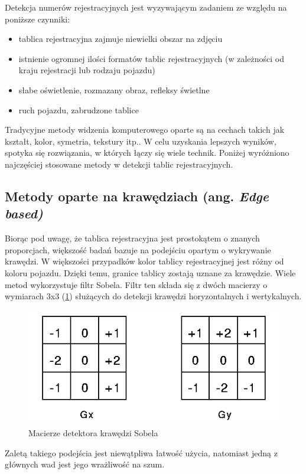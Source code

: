 Detekcja numerów rejestracyjnych jest wyzywającym zadaniem ze względu na poniższe czynniki:
\begin{itemize}
    \item tablica rejestracyjna zajmuje niewielki obszar na zdjęciu
    \item istnienie ogromnej ilości formatów tablic rejestracyjnych (w zależności od kraju rejestracji lub rodzaju pojazdu)
    \item słabe oświetlenie, rozmazany obraz, refleksy świetlne
    \item ruch pojazdu, zabrudzone tablice
\end{itemize}
Tradycyjne metody widzenia komputerowego oparte są na cechach takich jak kształt, kolor, symetria, tekstury itp.\cite{9310202}.
W celu uzyskania lepszych wyników, spotyka się rozwiązania, w których łączy się wiele technik.
Poniżej wyróżniono najczęściej stosowane metody w detekcji tablic rejestracyjnych.

\subsection{Metody oparte na krawędziach (ang. \textit{Edge based)}}
Biorąc pod uwagę, że tablica rejestracyjna jest prostokątem o znanych proporcjach, większość badań bazuje na podejściu opartym o wykrywanie krawędzi.
W większości przypadków kolor tablicy rejestracyjnej jest różny od koloru pojazdu.
Dzięki temu, granice tablicy zostają uznane za krawędzie.
Wiele metod wykorzystuje filtr Sobela.
Filtr ten składa się z dwóch macierzy o wymiarach 3x3 (\ref{fig:sobel_filter}) służących do detekcji krawędzi horyzontalnych i wertykalnych.
\FloatBarrier
\begin{figure}[!ht]
    \centering
    \includegraphics[scale=0.6]{Pictures/sobel_filter}
    \caption{Macierze detektora krawędzi Sobela}
    \label{fig:sobel_filter}
\end{figure}
\FloatBarrier
Zaletą takiego podejścia jest niewątpliwa łatwość użycia, natomiast jedną z głównych wad jest jego wrażliwość na szum.

